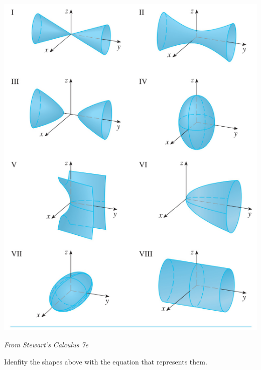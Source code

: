 \documentclass[12pt]{exam}
\begin{document}
\begin{questions}
        \begin{center}
            \includegraphics[width=.5\textwidth]{exercises.pdf}

            \emph{From Stewart's Calculus 7e}
        \end{center}

        \question Idenfity the shapes above with the equation that represents them.
        \begin{multicols}{2}
\end{multicols}
\end{questions}
\end{document}
